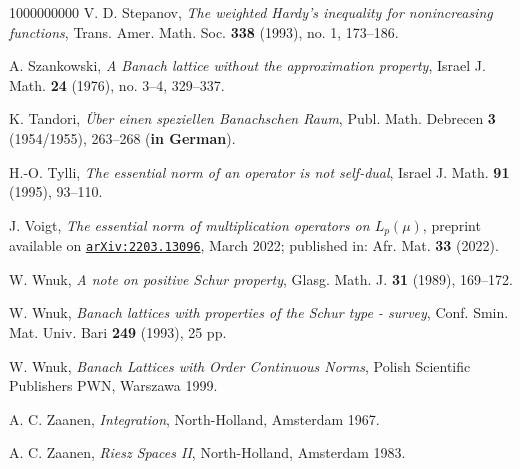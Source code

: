\documentclass[11pt]{amsart}
\theoremstyle{definition}
\theoremstyle{definition}
\theoremstyle{definition}
\theoremstyle{definition}
\theoremstyle{definition}
\theoremstyle{definition}
\theoremstyle{definition}
\theoremstyle{definition}
\numberwithin{equation}{section}
\numberwithin{equation}{section}
\numberwithin{equation}{section}
\theoremstyle{definition}
\theoremstyle{definition}
\theoremstyle{definition}
\theoremstyle{definition}
\theoremstyle{definition}
\theoremstyle{definition}
\begin{document}
\begin{thebibliography}{1000000000}
	 V. D. Stepanov, {\it The weighted Hardy's inequality for nonincreasing functions}, Trans. Amer. Math. Soc. {\bf 338} (1993), no. 1, 173--186.
	
	 A. Szankowski, {\it A Banach lattice without the approximation property}, Israel J. Math. {\bf 24} (1976), no. 3--4, 329--337.
	
	 K. Tandori, {\it {\" U}ber einen speziellen Banachschen Raum}, Publ. Math. Debrecen {\bf 3} (1954/1955), 263--268 ({\bf in German}).
	
	 H.-O. Tylli, {\it The essential norm of an operator is not self-dual}, Israel J. Math. {\bf 91} (1995), 93--110.
	
	 J. Voigt, {\it The essential norm of multiplication operators on $L_p(\mu)$}, preprint available on
	\href{https:/https://arXiv:2203.13096.pdf}{\texttt{arXiv:2203.13096}}, March 2022; published in: Afr. Mat. {\bf 33} (2022).
	
	 W. Wnuk, {\it A note on positive Schur property}, Glasg. Math. J. {\bf 31} (1989), 169--172.
	
	 W. Wnuk, {\it Banach lattices with properties of the Schur type - survey}, Conf. Smin. Mat. Univ. Bari {\bf 249} (1993), 25 pp.
	
	 W. Wnuk, {\it Banach Lattices with Order Continuous Norms}, Polish Scientific Publishers PWN, Warszawa 1999.
	
	 A. C. Zaanen, {\it Integration}, North-Holland, Amsterdam 1967.
	
	 A. C. Zaanen, {\it Riesz Spaces II}, North-Holland, Amsterdam 1983.
	
\end{thebibliography}
\end{document}
